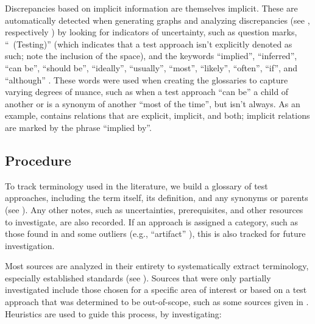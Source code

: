 Discrepancies based on implicit information are themselves implicit. These are
automatically detected when generating graphs and analyzing discrepancies
(see \ifnotpaper {}, respectively\else
    \fi) by looking for indicators
of uncertainty, such as question marks, ``~(Testing)'' (which indicates that a
test approach isn't explicitly denoted as such; note the inclusion of the
space), and the keywords ``implied'', ``inferred'', ``can be'', ``should be'',
``ideally'', ``usually'', ``most'', ``likely'', ``often'', ``if'', and ``although''
. These words were used when creating
the glossaries to capture varying degrees of nuance, such as when a test
approach ``can be'' a child of another or is a synonym of another ``most of the
time'', but isn't always. As an example,  contains relations
that are explicit, implicit, and both; implicit relations are marked by the
phrase ``implied by''.

\subsection{Procedure}
\label{procedure}

To track terminology used in the literature, we build a glossary of test
approaches, including the term itself, its definition, and
any synonyms or parents (see ). Any other notes, such as
uncertainties, prerequisites, and other resources to investigate, are also
recorded. If an approach is assigned a category, such as those found in
 and some outliers (e.g., ``artifact''%
), this is also tracked for future investigation.

Most sources are analyzed in their entirety to systematically extract
terminology, especially established standards (see ). Sources that
were only partially investigated include those chosen for a specific area of
interest or based on a test approach that was determined to be out-of-scope,
such as some sources given in .
Heuristics are used to guide this process, by investigating:

